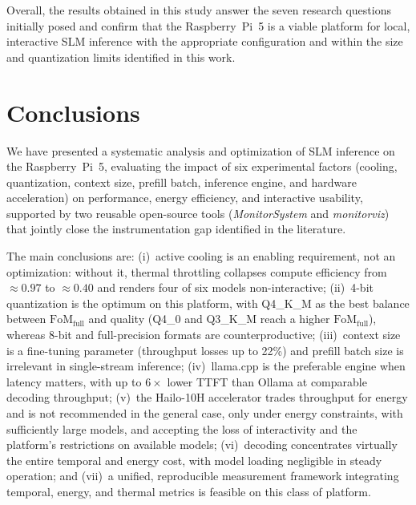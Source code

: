 \documentclass[acmsmall,natbib=false]{acmart}
\begin{document}
Overall, the results obtained in this study answer the seven research questions initially posed
and confirm that the Raspberry~Pi~5 is a viable platform for local, interactive SLM inference
with the appropriate configuration and within the size and quantization
limits identified in this work.

\section{Conclusions}\label{sec:conclusions}

We have presented a systematic analysis and optimization of SLM 
inference on the Raspberry~Pi~5, evaluating the impact of six
experimental factors (cooling, quantization, context size, prefill batch,
inference engine, and hardware acceleration) on performance, energy
efficiency, and interactive usability, supported by two reusable open-source
tools (\textit{MonitorSystem} and \textit{monitorviz}) that jointly close the instrumentation
gap identified in the literature.

The main conclusions are: (i)~active cooling is an enabling requirement, not
an optimization: without it, thermal throttling collapses compute
efficiency from ${\approx}0.97$ to ${\approx}0.40$ and renders four of six
models non-interactive; (ii)~4-bit quantization is the optimum on this
 platform, with Q4\_K\_M as the best balance between $\mathrm{FoM}_{\mathrm{full}}$ and
quality (Q4\_0 and Q3\_K\_M reach a higher $\mathrm{FoM}_{\mathrm{full}}$), whereas 8-bit and full-precision formats are
counterproductive; (iii)~context size is a fine-tuning parameter (throughput
losses up to 22\%) and prefill batch size is irrelevant in single-stream
inference; (iv)~llama.cpp is the preferable engine when latency matters,
with up to $6\times$ lower TTFT than Ollama at comparable decoding
throughput; (v)~the Hailo-10H accelerator trades throughput for energy and is
not recommended in the general case, only under energy constraints, with
sufficiently large models, and accepting the loss of interactivity and the
platform's restrictions on available models;
(vi)~decoding concentrates virtually the entire temporal and energy cost,
with model loading negligible in steady operation; and (vii)~a unified,
reproducible measurement framework integrating temporal, energy, and thermal
metrics is feasible on this class of platform.
\end{document}
